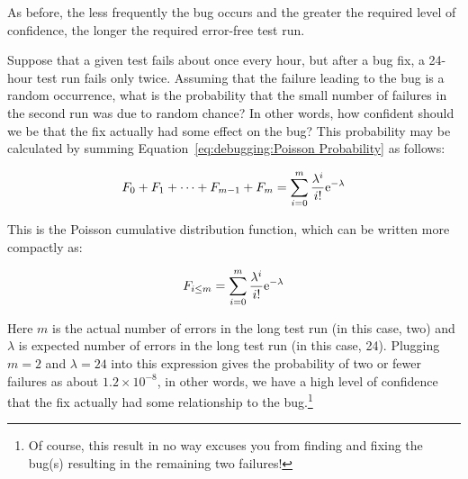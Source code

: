 \QuickQuizEnd

As before, the less frequently the bug occurs and the greater the
required level of confidence, the longer the required error-free test run.

Suppose that a given test fails about once every hour, but after a bug
fix, a 24-hour test run fails only twice.
Assuming that the failure leading to the bug is a random occurrence,
what is the probability that the small number of
failures in the second run was due to random chance?
In other words, how confident should we be that the fix actually
had some effect on the bug?
This probability may be calculated by summing
Equation~\ref{eq:debugging:Poisson Probability} as follows:

\begin{equation}
	F_0 + F_1 + \dots + F_{m - 1} + F_m =
		\sum_{i=0}^m \frac{\lambda^i}{i!} \mathrm{e}^{-\lambda}
\end{equation}

This is the Poisson cumulative distribution function, which can be
written more compactly as:

\begin{equation}
	F_{i \le m} = \sum_{i=0}^m \frac{\lambda^i}{i!} \mathrm{e}^{-\lambda}
\label{eq:debugging:Possion CDF}
\end{equation}

Here $m$ is the actual number of errors in the long test run
(in this case, two) and $\lambda$ is expected number of errors
in the long test run (in this case, 24).
Plugging $m=2$ and $\lambda=24$ into this expression gives the probability
of two or fewer failures as about
$1.2 \times 10^{-8}$, in other words, we have a high level of confidence
that the fix actually had some relationship to the bug.\footnote{
	Of course, this result in no way excuses you from finding and
	fixing the bug(s) resulting in the remaining two failures!}

